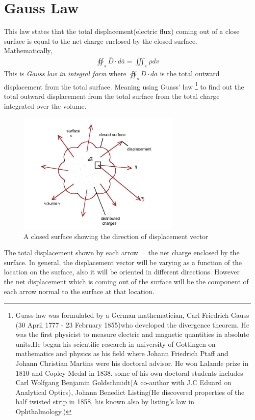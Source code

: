 \section{Gauss Law}
This law states that the total displacement(electric flux) coming out of a close surface is equal to the net charge enclosed by the closed surface.\\
Mathematically, 
\begin{align}
\boxed{\oiint_s\bar{D}\cdot{d\bar{a}} = \iiint_v\rho dv}
\end{align}
This is  \emph{Gauss law in integral form} where $\oiint_s\bar{D}\cdot d\bar{a}$ is the total outward displacement from the total surface. Meaning using Guass' law \footnote[5]{Guass law was formulated by a German mathematician, Carl Friedrich Gauss (30 April 1777 - 23 February 1855)who developed the divergence theorem. He was the first physicist to measure  electric  and magnetic  quantities in absolute  units.He began his scientific research in university of Gottingen on mathematics and physics as his field where Johann Friedrich Ptaff and Johann Christian Martins were his doctoral advisor. He won Lalande prize in 1810 and Copley Medal in 1838. some of his own doctoral students includes Carl Wolfgang Benjamin Goldschmidt(A co-author with J.C Eduard on Analytical Optics), Johann Benedict Listing(He discovered properties of the half twisted strip in 1858, his known also by listing's law in Ophthalmology.)} to find out the total outward displacement from the total surface from the total charge integrated over the volume.
\begin{figure}[h]
\centering
\includegraphics[height=6cm]{./graphics/g}
\caption{A closed surface showing the direction of displacement vector}
\label{fig:g}
\end{figure}

The total displacement shown by each arrow = the net charge enclosed by the surface. In general, the displacement vector will be varying as a function of the location on the surface, also it will be oriented in different directions. However the net displacement which is coming out of the surface will be the component of each arrow normal to the surface at that location.

